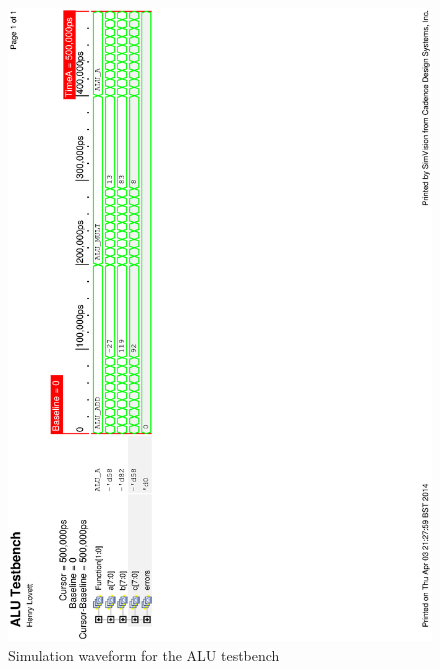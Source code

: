 \begin{figure}
\includegraphics[height=\textheight]{Figures/alusim.eps}
\caption{Simulation waveform for the ALU testbench}
\label{fig:alusim}
\end{figure}


